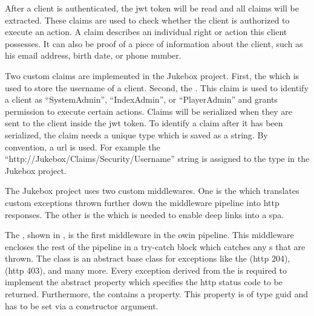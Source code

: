 \newpage



After a client is authenticated, the \gls{jwt} token will be read and all claims will be extracted. These claims are used to check whether the client is authorized to execute an action. A claim describes an individual right or action this client possesses. It can also be proof of a piece of information about the client, such as his email address, birth date, or phone number.

Two custom claims are implemented in the Jukebox project. First, the  which is used to store the username of a client. Second, the . This claim is used to identify a client as \enquote{SystemAdmin}, \enquote{IndexAdmin}, or \enquote{PlayerAdmin} and grants permission to execute certain actions. Claims will be serialized when they are sent to the client inside the \gls{jwt} token. To identify a claim after it has been serialized, the claim needs a unique type which is saved as a string. By convention, a \gls{url} is used. For example the \enquote{http://Jukebox/Claims/Security/Username} string is assigned to the  type in the Jukebox project. \cite{claimsBasedAuth}


The Jukebox project uses two custom middlewares. One is the  which translates custom exceptions thrown further down the middleware pipeline into \gls{http} responses. The other is the  which is needed to enable deep links into a \gls{spa}.


The , shown in , is the first middleware in the \gls{owin} pipeline. This middleware encloses the rest of the pipeline in a try-catch block which catches any s that are thrown. The  class is an abstract base class for exceptions like the  (\gls{http} 204),  (\gls{http} 403), and many more. Every exception derived from the  is required to implement the abstract  property which specifies the \gls{http} status code to be returned. Furthermore, the  contains a  property. This property is of type \gls{guid} and has to be set via a constructor argument.

